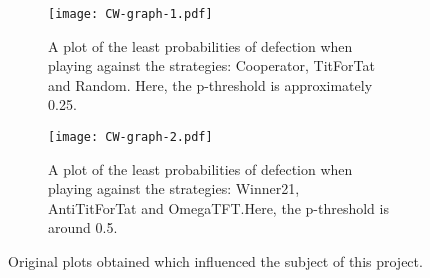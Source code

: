 \begin{figure}
        \begin{subfigure}{0.45\textwidth}
            \centering
            \texttt{[image: CW-graph-1.pdf]}
            \caption{A plot of the least probabilities of defection when playing against the strategies: Cooperator, TitForTat and Random. Here, the p-threshold is approximately 0.25.}\label{fig:CW_graph_1}
        \end{subfigure}
        \begin{subfigure}{0.45\textwidth}
            \centering
            \texttt{[image: CW-graph-2.pdf]}
            \caption{A plot of the least probabilities of defection when playing against the strategies: Winner21, AntiTitForTat and OmegaTFT.\@ Here, the p-threshold is around 0.5.}\label{fig:CW_graph_2}
        \end{subfigure}
        \caption{Original plots obtained which influenced the subject of this project.}\label{fig:CW_plots}
\end{figure}

